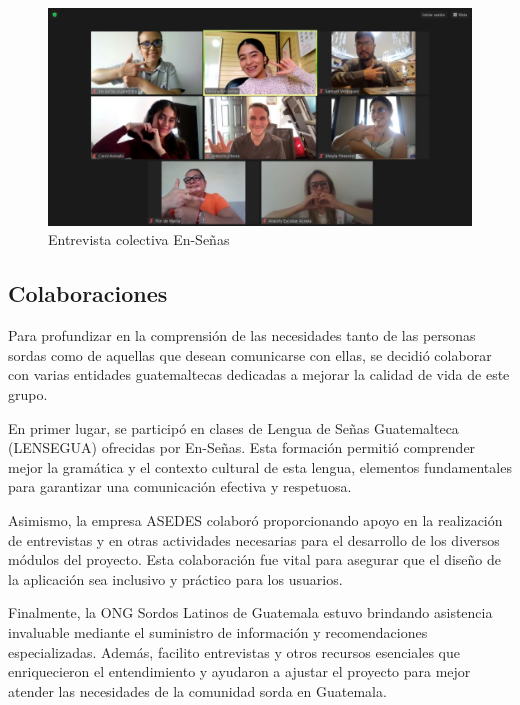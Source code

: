 \begin{figure} [H]
    \centering
    \includegraphics[width=0.75\linewidth]{figuras/entrevista_colectiva.png}
    \caption{Entrevista colectiva En-Señas}
    \label{fig:enter-label}
\end{figure}



\subsection{Colaboraciones}

Para profundizar en la comprensión de las necesidades tanto de las personas sordas como de aquellas que desean comunicarse con ellas, se decidió colaborar con varias entidades guatemaltecas dedicadas a mejorar la calidad de vida de este grupo.

En primer lugar, se participó en clases de Lengua de Señas Guatemalteca (LENSEGUA) ofrecidas por En-Señas. Esta formación permitió comprender mejor la gramática y el contexto cultural de esta lengua, elementos fundamentales para garantizar una comunicación efectiva y respetuosa.

Asimismo, la empresa ASEDES colaboró proporcionando apoyo en la realización de entrevistas y en otras actividades necesarias para el desarrollo de los diversos módulos del proyecto. Esta colaboración fue vital para asegurar que el diseño de la aplicación sea inclusivo y práctico para los usuarios.

Finalmente, la ONG Sordos Latinos de Guatemala estuvo brindando asistencia invaluable mediante el suministro de información y recomendaciones especializadas. Además, facilito entrevistas y otros recursos esenciales que enriquecieron el entendimiento y ayudaron a ajustar el proyecto para mejor atender las necesidades de la comunidad sorda en Guatemala.

